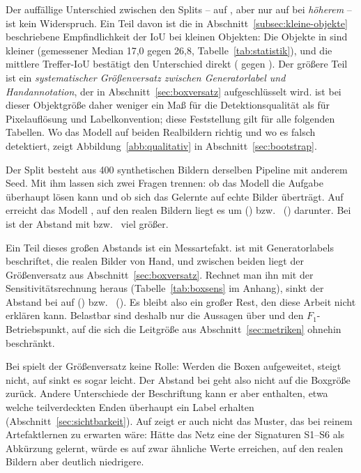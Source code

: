 Der auffällige Unterschied zwischen den Splits -- \mAPseven{} \zrefValMapS{}
auf , aber nur \zrefTestMapS{} auf  bei \emph{höherem}
\mAPfifty{} -- ist kein Widerspruch. Ein Teil davon ist die in
Abschnitt~\ref{subsec:kleine-objekte} beschriebene Empfindlichkeit der IoU bei
kleinen Objekten: Die Objekte in  sind kleiner (gemessener Median
17,0 gegen 26,8\px, Tabelle~\ref{tab:statistik}), und die mittlere Treffer-IoU
bestätigt den Unterschied direkt (\zrefTestIou{} gegen \zrefValIou). Der
größere Teil ist ein \emph{systematischer Größenversatz zwischen
Generatorlabel und Handannotation}, der in Abschnitt~\ref{sec:boxversatz}
aufgeschlüsselt wird. \mAPall{} ist bei dieser Objektgröße daher weniger ein
Maß für die Detektionsqualität als für Pixelauflösung und Labelkonvention;
diese Feststellung gilt für alle folgenden Tabellen. Wo das Modell auf beiden
Realbildern richtig und wo es falsch detektiert, zeigt
Abbildung~\ref{abb:qualitativ} in
Abschnitt~\ref{sec:bootstrap}.

\label{sec:simtoreal}
Der Split  besteht aus 400 synthetischen Bildern derselben Pipeline
mit anderem Seed. Mit ihm lassen sich zwei Fragen trennen: ob das Modell die
Aufgabe überhaupt lösen kann und ob sich das Gelernte auf echte Bilder
überträgt. Auf  erreicht das Modell \zrefSvalMap{} \mAPfifty, auf
den realen Bildern liegt es um \zsimRealVal{} () bzw.\
\zsimRealTest\PP{} () darunter. Bei \mAPall{} ist der Abstand mit
\zsimRealValA{} bzw.\ \zsimRealTestA\PP{} viel größer.

Ein Teil dieses großen Abstands ist ein Messartefakt.  ist mit
Generatorlabels beschriftet, die realen Bilder von Hand, und zwischen beiden
liegt der Größenversatz aus Abschnitt~\ref{sec:boxversatz}. Rechnet man ihn mit
der Sensitivitätsrechnung heraus (Tabelle~\ref{tab:boxsens} im Anhang), sinkt
der Abstand bei \mAPall{} auf \zsimRealTestAKorr{} (\code{test}) bzw.\
\zsimRealValAKorr\PP{} (). Es bleibt also ein großer Rest, den diese
Arbeit nicht erklären kann. Belastbar sind deshalb nur die Aussagen über
\mAPfifty{} und den $F_1$-Betriebspunkt, auf die sich die Leitgröße aus
Abschnitt~\ref{sec:metriken} ohnehin beschränkt.

Bei \mAPfifty{} spielt der Größenversatz keine Rolle: Werden die Boxen
aufgeweitet, steigt \mAPfifty{} nicht, auf  sinkt es sogar leicht.
Der Abstand bei \mAPfifty{} geht also nicht auf die Boxgröße zurück. Andere
Unterschiede der Beschriftung kann er aber enthalten, etwa welche teilverdeckten
Enden überhaupt ein Label erhalten (Abschnitt~\ref{sec:sichtbarkeit}). Auf  zeigt er auch nicht das
Muster, das bei reinem Artefaktlernen zu erwarten wäre: Hätte das Netz eine der
Signaturen S1--S6 als Abkürzung gelernt, würde es auf \code{sval} zwar ähnliche
Werte erreichen, auf den realen Bildern aber deutlich niedrigere.

